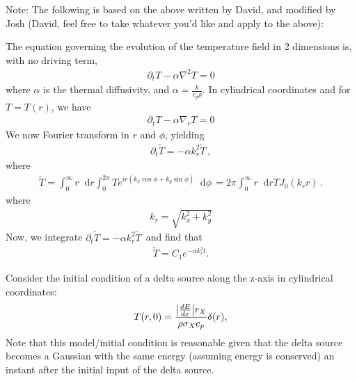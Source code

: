 \documentclass{article}
\newcommand*\diff{\mathop{}\!\mathrm{d}}
\newcommand*\f[2]{\frac{#1}{#2}}
\begin{document}
\pagebreak
Note: The following is based on the above written by David, and modified by Josh (David, feel free to take whatever you'd like and apply to the above):

The equation governing the evolution of the temperature field in 2 dimensions is, with no driving term,
\begin{align}
\partial_t T - \alpha\nabla^2 T = 0
\end{align}
where $\alpha$ is the thermal diffusivity, and $\alpha=\f{k}{c_p\rho}$. In cylindrical coordinates and for $T = T(r)$, we have
\begin{align}
\partial_t T - \alpha\nabla_r T = 0
\end{align}
We now Fourier transform in $r$ and $\phi$, yielding
\begin{align}
\partial_t\tilde T =-\alpha k_r^2 \tilde T\,,
\end{align}
where
\begin{align}
\tilde T =  \int_0^\infty r \diff r\int_{0}^{2\pi} T e^{i r(k_x\cos\phi +k_y\sin\phi)}\diff \phi\, = 2\pi \int_0^\infty r \diff r  T J_0(k_r r)\,.
\end{align}
where
\begin{align}
k_r = \sqrt{k_x^2 +k_y^2}
\end{align}
Now, we integrate $\partial_t\tilde T =-\alpha k_r^2 \tilde T\,$ and find that
\begin{align}
\tilde T = C_1e^{-\alpha k_r^2 t}.
\end{align}

Consider the initial condition of a delta source along the z-axis in cylindrical coordinates:
\begin{align}
T(r,0) = \f{\abs{\frac{dE}{dx}}r_X}{\rho \sigma_X c_p}\delta(r),
\end{align}
Note that this model/initial condition is reasonable given that the delta source becomes a Gaussian with the same energy (assuming energy is conserved) an instant after the initial input of the delta source.
\end{document}
